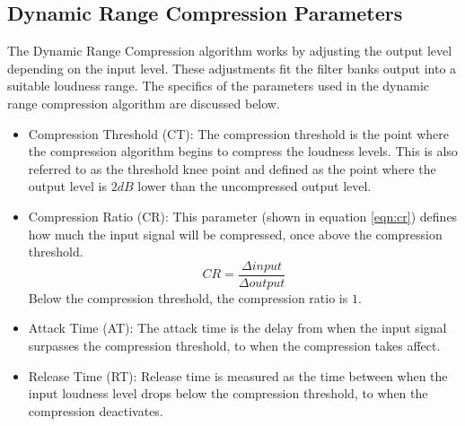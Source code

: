 \documentclass[11pt,onecolumn]{witseiepaper}
\begin{document}
\begin{appendices}
\section{Dynamic Range Compression Parameters}
\label{app:compressPara}

\noindent The Dynamic Range Compression algorithm works by adjusting the output level depending on the input level. These adjustments fit the filter banks output into a suitable loudness range. The specifics of the parameters used in the dynamic range compression algorithm are discussed below.

\begin{itemize}
	\item Compression Threshold (CT): The compression threshold is the point where the compression algorithm begins to compress the loudness levels. This is also referred to as the threshold knee point and defined as the point where the output level is $2dB$ lower than the uncompressed output level.
	\item Compression Ratio (CR): This parameter (shown in equation \ref{eqn:cr}) defines how much the input signal will be compressed, once above the compression threshold. 
	\begin{equation}
	\label{eqn:cr}
		CR = \frac{\Delta input}{\Delta output}
	\end{equation}
	\noindent Below the compression threshold, the compression ratio is $1$.
	\item Attack Time (AT): The attack time is the delay from when the input signal surpasses the compression threshold, to when the compression takes affect.
	\item Release Time (RT): Release time is measured as the time between when the input loudness level drops below the compression threshold, to when the compression deactivates.
\end{itemize}

\FloatBarrier



\end{appendices}
\end{document}
